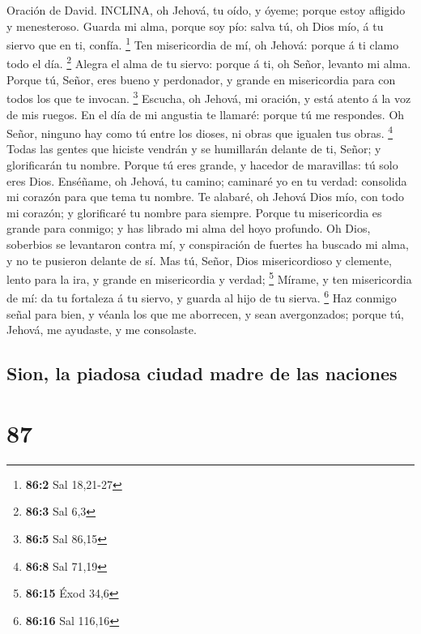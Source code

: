  Oración de David. INCLINA, oh Jehová, tu oído, y óyeme;
porque estoy afligido y menesteroso.  Guarda mi alma, porque
soy pío: salva tú, oh Dios mío, á tu siervo que en ti, confía.
\footnote{\textbf{86:2} Sal 18,21-27}  Ten misericordia de
mí, oh Jehová: porque á ti clamo todo el día. \footnote{\textbf{86:3}
  Sal 6,3}  Alegra el alma de tu siervo: porque á ti, oh
Señor, levanto mi alma.  Porque tú, Señor, eres bueno y
perdonador, y grande en misericordia para con todos los que te invocan.
\footnote{\textbf{86:5} Sal 86,15}  Escucha, oh Jehová, mi
oración, y está atento á la voz de mis ruegos.  En el día de
mi angustia te llamaré: porque tú me respondes.  Oh Señor,
ninguno hay como tú entre los dioses, ni obras que igualen tus obras.
\footnote{\textbf{86:8} Sal 71,19}  Todas las gentes que
hiciste vendrán y se humillarán delante de ti, Señor; y glorificarán tu
nombre.  Porque tú eres grande, y hacedor de maravillas: tú
solo eres Dios.  Enséñame, oh Jehová, tu camino; caminaré
yo en tu verdad: consolida mi corazón para que tema tu nombre.
 Te alabaré, oh Jehová Dios mío, con todo mi corazón; y
glorificaré tu nombre para siempre.  Porque tu misericordia
es grande para conmigo; y has librado mi alma del hoyo profundo.
 Oh Dios, soberbios se levantaron contra mí, y conspiración
de fuertes ha buscado mi alma, y no te pusieron delante de sí.
 Mas tú, Señor, Dios misericordioso y clemente, lento para
la ira, y grande en misericordia y verdad; \footnote{\textbf{86:15} Éxod
  34,6}  Mírame, y ten misericordia de mí: da tu fortaleza
á tu siervo, y guarda al hijo de tu sierva. \footnote{\textbf{86:16} Sal
  116,16}  Haz conmigo señal para bien, y véanla los que me
aborrecen, y sean avergonzados; porque tú, Jehová, me ayudaste, y me
consolaste.

\hypertarget{sion-la-piadosa-ciudad-madre-de-las-naciones}{%
\subsection{Sion, la piadosa ciudad madre de las
naciones}\label{sion-la-piadosa-ciudad-madre-de-las-naciones}}

\hypertarget{section-86}{%
\section{87}\label{section-86}}


